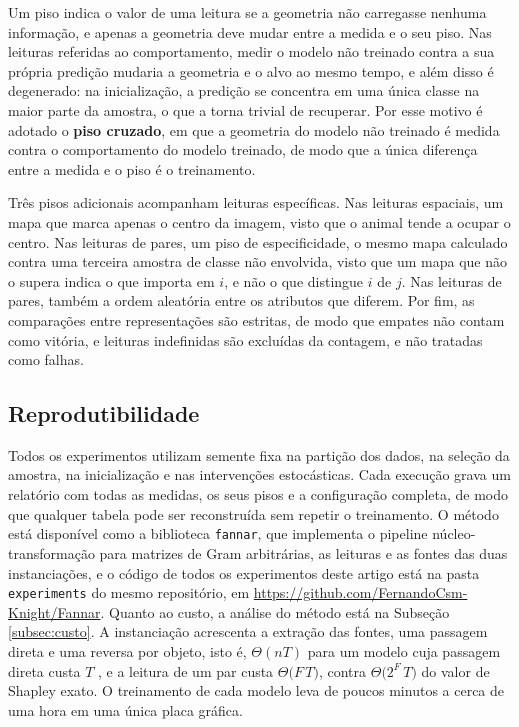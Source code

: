 Um piso indica o valor de uma leitura se a geometria não carregasse nenhuma informação, e apenas a geometria deve mudar entre a medida e o seu piso. Nas leituras referidas ao comportamento, medir o modelo não treinado contra a sua própria predição mudaria a geometria e o alvo ao mesmo tempo, e além disso é degenerado: na inicialização, a predição se concentra em uma única classe na maior parte da amostra, o que a torna trivial de recuperar. Por esse motivo é adotado o \textbf{piso cruzado}, em que a geometria do modelo não treinado é medida contra o comportamento do modelo treinado, de modo que a única diferença entre a medida e o piso é o treinamento.

Três pisos adicionais acompanham leituras específicas. Nas leituras espaciais, um mapa que marca apenas o centro da imagem, visto que o animal tende a ocupar o centro. Nas leituras de pares, um piso de especificidade, o mesmo mapa calculado contra uma terceira amostra de classe não envolvida, visto que um mapa que não o supera indica o que importa em $i$, e não o que distingue $i$ de $j$. Nas leituras de pares, também a ordem aleatória entre os atributos que diferem. Por fim, as comparações entre representações são estritas, de modo que empates não contam como vitória, e leituras indefinidas são excluídas da contagem, e não tratadas como falhas.

\subsection{Reprodutibilidade}\label{subsec:reprodutibilidade}

Todos os experimentos utilizam semente fixa na partição dos dados, na seleção da amostra, na inicialização e nas intervenções estocásticas. Cada execução grava um relatório com todas as medidas, os seus pisos e a configuração completa, de modo que qualquer tabela pode ser reconstruída sem repetir o treinamento. O método está disponível como a biblioteca \texttt{fannar}, que implementa o pipeline núcleo-transformação para matrizes de Gram arbitrárias, as leituras e as fontes das duas instanciações, e o código de todos os experimentos deste artigo está na pasta \texttt{experiments} do mesmo repositório, em \url{https://github.com/FernandoCsm-Knight/Fannar}. Quanto ao custo, a análise do método está na Subseção \ref{subsec:custo}. A instanciação acrescenta a extração das fontes, uma passagem direta e uma reversa por objeto, isto é, $\Theta(nT)$ para um modelo cuja passagem direta custa $T$ \citep{GriewankWalther2008}, e a leitura de um par custa $\Theta\bigl(F\,T\bigr)$, contra $\Theta\bigl(2^F\,T\bigr)$ do valor de Shapley exato. O treinamento de cada modelo leva de poucos minutos a cerca de uma hora em uma única placa gráfica.
